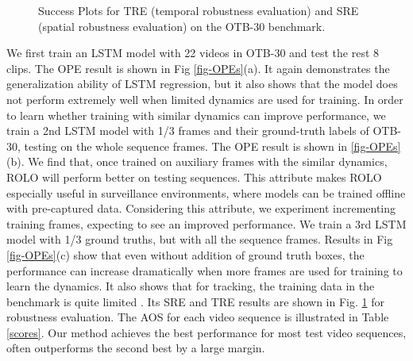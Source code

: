 \documentclass{article}
\begin{document}
\begin{figure}[!ht]
	\centering
	\caption{Success Plots for TRE (temporal robustness evaluation) and SRE (spatial robustness evaluation) on the OTB-30 benchmark.}
	\label{fig-robustness-eval}
\end{figure}
We first train an LSTM model with 22 videos in OTB-30 and test the rest 8 clips.
The OPE result is shown in Fig \ref{fig-OPEs}(a). It again demonstrates the generalization ability of LSTM regression, but it also shows that %
the model does not perform extremely well
when limited dynamics are used for training.
In order to learn whether training with similar dynamics can improve performance, we train a 2nd LSTM model with 1/3 frames and their ground-truth labels of OTB-30, testing on the whole sequence frames. The OPE result is shown in \ref{fig-OPEs}(b).
We find that, once trained on auxiliary frames with the similar dynamics, ROLO will perform better on testing sequences. This attribute makes ROLO especially useful in surveillance environments, where models can be trained offline with pre-captured data.
Considering this attribute, we experiment incrementing training frames, expecting to see an improved performance. We train a 3rd LSTM model with 1/3 ground truths, but with all the sequence frames. Results in Fig \ref{fig-OPEs}(c) show that even without addition of ground truth boxes, the performance can increase dramatically when more frames are used for training to learn the dynamics.
It also shows that for tracking, the training data in the benchmark is quite limited \citep{nam2015learning}.
Its SRE and TRE results are shown in Fig. \ref{fig-robustness-eval} for robustness evaluation.
The AOS for each video sequence is illustrated in Table \ref{scores}. Our method achieves the best performance for most test video sequences, often outperforms the second best by a large margin.
\end{document}
